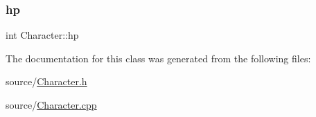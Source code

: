 \subsubsection{\texorpdfstring{hp}{hp}}
{\footnotesize\ttfamily int Character\+::hp\hspace{0.3cm}{\ttfamily [protected]}}



The documentation for this class was generated from the following files\+:\begin{DoxyCompactItemize}
\item 
source/\hyperlink{Character_8h}{Character.\+h}\item 
source/\hyperlink{Character_8cpp}{Character.\+cpp}\end{DoxyCompactItemize}
